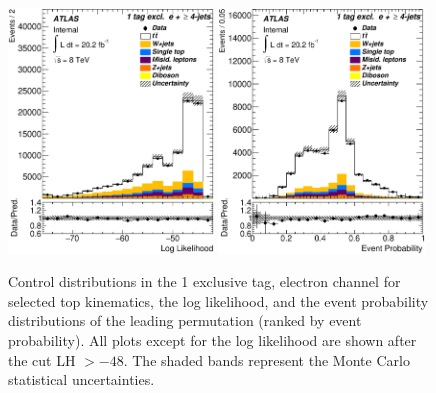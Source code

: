 \begin{figure}[!h]
\begin{center}
		\includegraphics[height=65mm]{chapters/whel/figures/control_Plots2/bTag_1excl_NoLHCut/LogLikelihood_el}
        \includegraphics[height=65mm]{chapters/whel/figures/control_Plots2/bTag_1excl/EventProbability_el}
	\caption{Control distributions in the 1 exclusive \bt tag, electron channel for selected top kinematics, the log likelihood, and the event probability distributions of the leading permutation (ranked by event probability). All plots except for the log likelihood are shown after the cut LH $> -48$. The shaded bands represent the Monte Carlo statistical uncertainties.}
	\label{fig:klfitter_control_plots_1}
	\end{center}    
	\end{figure}    
	
